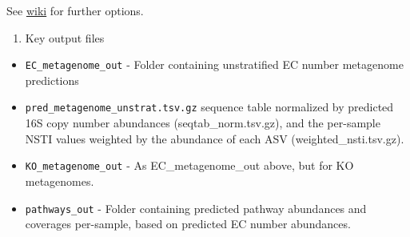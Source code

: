 \documentclass[
]{book}
\providecommand{\tightlist}{%
  \setlength{\itemsep}{0pt}\setlength{\parskip}{0pt}}
\begin{document}
See \href{https://github.com/picrust/picrust2/wiki/Full-pipeline-script}{wiki} for further options.

\begin{enumerate}
\def\labelenumi{\arabic{enumi}.}
\setcounter{enumi}{3}
\tightlist
\item
  Key output files
\end{enumerate}

\begin{itemize}
\tightlist
\item
  \texttt{EC\_metagenome\_out} - Folder containing unstratified EC number metagenome predictions
\item
  \texttt{pred\_metagenome\_unstrat.tsv.gz} sequence table normalized by predicted 16S copy number abundances (seqtab\_norm.tsv.gz), and the per-sample NSTI values weighted by the abundance of each ASV (weighted\_nsti.tsv.gz).
\item
  \texttt{KO\_metagenome\_out} - As EC\_metagenome\_out above, but for KO metagenomes.
\item
  \texttt{pathways\_out} - Folder containing predicted pathway abundances and coverages per-sample, based on predicted EC number abundances.
\end{itemize}

  
\end{document}
